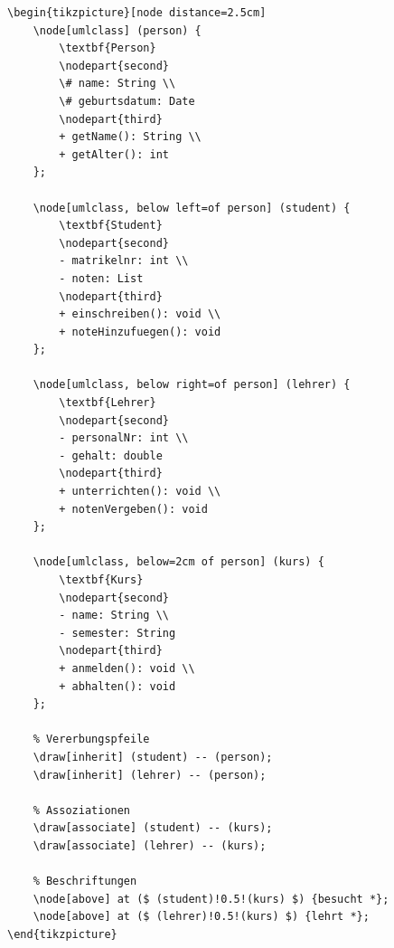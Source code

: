 \begin{lstlisting}[style=latex]
\begin{tikzpicture}[node distance=2.5cm]
	\node[umlclass] (person) {
		\textbf{Person}
		\nodepart{second}
		\# name: String \\
		\# geburtsdatum: Date
		\nodepart{third}
		+ getName(): String \\
		+ getAlter(): int
	};
		
	\node[umlclass, below left=of person] (student) {
		\textbf{Student}
		\nodepart{second}
		- matrikelnr: int \\
		- noten: List
		\nodepart{third}
		+ einschreiben(): void \\
		+ noteHinzufuegen(): void
	};
		
	\node[umlclass, below right=of person] (lehrer) {
		\textbf{Lehrer}
		\nodepart{second}
		- personalNr: int \\
		- gehalt: double
		\nodepart{third}
		+ unterrichten(): void \\
		+ notenVergeben(): void
	};
		
	\node[umlclass, below=2cm of person] (kurs) {
		\textbf{Kurs}
		\nodepart{second}
		- name: String \\
		- semester: String
		\nodepart{third}
		+ anmelden(): void \\
		+ abhalten(): void
	};
	
	% Vererbungspfeile
	\draw[inherit] (student) -- (person);
	\draw[inherit] (lehrer) -- (person);
	
	% Assoziationen
	\draw[associate] (student) -- (kurs);
	\draw[associate] (lehrer) -- (kurs);
	
	% Beschriftungen
	\node[above] at ($ (student)!0.5!(kurs) $) {besucht *};
	\node[above] at ($ (lehrer)!0.5!(kurs) $) {lehrt *};
\end{tikzpicture}
\end{lstlisting}

